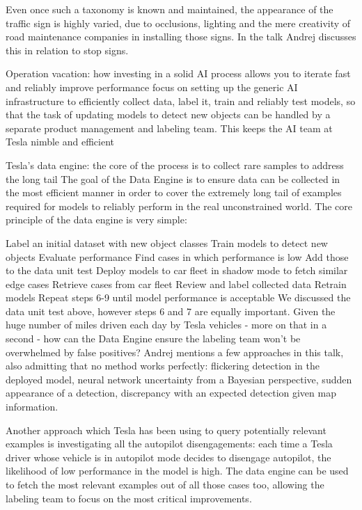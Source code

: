 Even once such a taxonomy is known and maintained, the appearance of the traffic sign is highly varied, due to occlusions, lighting and the mere creativity of road maintenance companies in installing those signs. In the talk Andrej discusses this in relation to stop signs.



Operation vacation: how investing in a solid AI process allows you to iterate fast and reliably improve performance
focus on setting up the generic AI infrastructure to efficiently collect data, label it, train and reliably test models, so that the task of updating models to detect new objects can be handled by a separate product management and labeling team. This keeps the AI team at Tesla nimble and efficient 

Tesla's data engine: the core of the process is to collect rare samples to address the long tail
The goal of the Data Engine is to ensure data can be collected in the most efficient manner in order to cover the extremely long tail of examples required for models to reliably perform in the real unconstrained world. The core principle of the data engine is very simple:

Label an initial dataset with new object classes
Train models to detect new objects
Evaluate performance
Find cases in which performance is low
Add those to the data unit test
Deploy models to car fleet in shadow mode to fetch similar edge cases
Retrieve cases from car fleet
Review and label collected data
Retrain models
Repeat steps 6-9 until model performance is acceptable
We discussed the data unit test above, however steps 6 and 7 are equally important. Given the huge number of miles driven each day by Tesla vehicles - more on that in a second - how can the Data Engine ensure the labeling team won't be overwhelmed by false positives? Andrej mentions a few approaches in this talk, also admitting that no method works perfectly: flickering detection in the deployed model, neural network uncertainty from a Bayesian perspective, sudden appearance of a detection, discrepancy with an expected detection given map information.

Another approach which Tesla has been using to query potentially relevant examples is investigating all the autopilot disengagements: each time a Tesla driver whose vehicle is in autopilot mode decides to disengage autopilot, the likelihood of low performance in the model is high. The data engine can be used to fetch the most relevant examples out of all those cases too, allowing the labeling team to focus on the most critical improvements.

